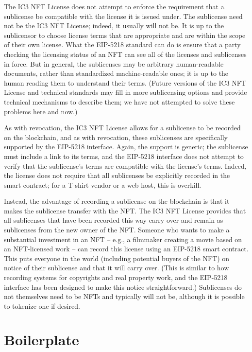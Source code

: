 \documentclass{article}
\newcommand{\eiplicense}{EIP-5218\xspace}
\newcommand{\iccclicense}{IC3 NFT License\xspace}
\begin{document}
The \iccclicense does not attempt to enforce the requirement that a sublicense be compatible with the license it is issued under. The sublicense need not be the \iccclicense; indeed, it usually will not be. It is up to the sublicensor to choose license terms that are appropriate and are within the scope of their own license. What the \eiplicense standard can do is ensure that a party checking the licensing status of an NFT can see all of the licenses and sublicenses in force. But in general, the sublicenses may be arbitrary human-readable documents, rather than standardized machine-readable ones; it is up to the human reading them to understand their terms. (Future versions of the \iccclicense and technical standards may fill in more sublicensing options and provide technical mechanisms to describe them; we have not attempted to solve these problems here and now.)

As with revocation, the \iccclicense allows for a sublicense to be recorded on the blockchain, and as with revocation, these sublicenses are specifically supported by the \eiplicense interface. Again, the support is generic; the sublicense must include a link to its terms, and the \eiplicense interface does not attempt to verify that the sublicense's terms are compatible with the license's terms. Indeed, the license does not require that all sublicenses be explicitly recorded in the smart contract; for a T-shirt vendor or a web host, this is overkill. 

Instead, the advantage of recording a sublicense on the blockchain is that it makes the sublicense transfer with the NFT. The \iccclicense provides that all sublicenses that have been recorded this way carry over and remain as sublicenses from the new owner of the NFT. Someone who wants to make a substantial investment in an NFT -- e.g., a filmmaker creating a movie based on an NFT-licensed work -- can record this license using an \eiplicense smart contract. This puts everyone in the world (including potential buyers of the NFT) on notice of their sublicense and that it will carry over. (This is similar to how recording systems for copyrights and real property work, and the \eiplicense interface has been designed to make this notice straightforward.)  Sublicenses do not themselves need to be NFTs and typically will not be, although it is possible to tokenize one if desired.



\section{Boilerplate}
\end{document}
